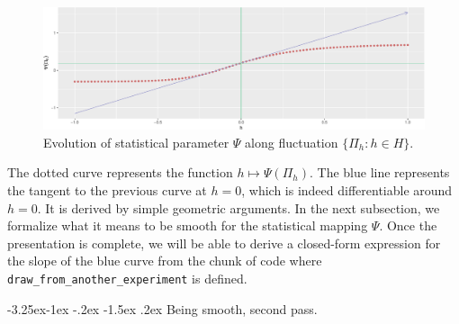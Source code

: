 \documentclass[]{article}
\makeatletter
\newenvironment{Shaded}{\begin{snugshade}}{\end{snugshade}}
\newcommand{\DataTypeTok}[1]{\textcolor[rgb]{0.13,0.29,0.53}{#1}}
\newcommand{\DecValTok}[1]{\textcolor[rgb]{0.00,0.00,0.81}{#1}}
\newcommand{\FloatTok}[1]{\textcolor[rgb]{0.00,0.00,0.81}{#1}}
\newcommand{\KeywordTok}[1]{\textcolor[rgb]{0.13,0.29,0.53}{\textbf{#1}}}
\newcommand{\NormalTok}[1]{#1}
\newcommand{\OperatorTok}[1]{\textcolor[rgb]{0.81,0.36,0.00}{\textbf{#1}}}
\newcommand{\StringTok}[1]{\textcolor[rgb]{0.31,0.60,0.02}{#1}}
\renewcommand\subsection{\@startsection{subsection}{3}{\z@}%
                                     {-3.25ex\@plus -1ex \@minus -.2ex}%
                                     {-1.5ex \@plus .2ex}%
                                     {\normalfont\normalsize\bfseries}}
\theoremstyle{definition}
\theoremstyle{definition}
\theoremstyle{definition}
\theoremstyle{remark}
\makeatother
\begin{document}
\begin{Shaded}
\end{Shaded}

\begin{figure}
\centering
\includegraphics{img/psi-approx-psi-one-1.pdf}
\caption{\label{fig:psi-approx-psi-one}Evolution of statistical parameter
\(\Psi\) along fluctuation \(\{\Pi_{h} : h \in H\}\).}
\end{figure}

The dotted curve represents the function \(h \mapsto \Psi(\Pi_{h})\).
The blue line represents the tangent to the previous curve at \(h=0\),
which is indeed differentiable around \(h=0\). It is derived by simple
geometric arguments. In the next subsection, we formalize what it means
to be smooth for the statistical mapping \(\Psi\). Once the presentation
is complete, we will be able to derive a closed-form expression for the
slope of the blue curve from the chunk of code where
\texttt{draw\_from\_another\_experiment} is defined.

\subsection{\textdbend Being smooth, second pass.}
\label{subsec:being:smooth:two}
\end{document}
